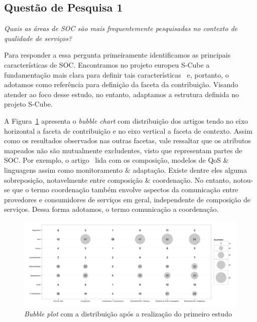 \subsection{Quest\~{a}o de Pesquisa 1}
\emph{Quais as áreas de SOC são mais frequentemente pesquisadas no contexto de qualidade de serviços?}


Para responder a essa pergunta primeiramente identificamos as principais caracter\'{i}sticas de SOC. Encontramos no projeto europeu S-Cube a fundamenta\c{c}\~{a}o mais clara para definir tais caracter\'{i}sticas~\cite{SCube-FINALREPORT} e, portanto, o adotamos como refer\^{e}ncia para definição da faceta da contribui\c{c}\~{a}o. Visando atender ao foco desse estudo, no entanto, adaptamos a estrutura definida no projeto S-Cube. 


A Figura~\ref{fig:bubbleplot-QoSSOC} apresenta o \emph{bubble chart} com distribui\c{c}\~{a}o dos artigos tendo no eixo horizontal a faceta de contribui\c{c}\~{a}o e no eixo vertical a faceta de contexto. Assim como os resultados observados nas outras facetas, vale ressaltar que os atributos mapeados não são mutualmente excludentes, visto que representam partes de SOC. Por exemplo, o artigo~\cite{DBLP:conf/dsn/ZhengL09} lida com os composi\c{c}\~{a}o, modelos de QoS \& linguagens assim como monitoramento \& adapta\c{c}\~{a}o. Existe dentre eles alguma sobreposição, notavelmente entre composição \& coordenação. No entanto, notou-se que o termo coordenação também envolve aspectos da comunicação entre provedores e consumidores de serviços em geral, independente de composição de serviços. Dessa forma adotamos, o termo comunicação a coordena\c{c}\~{a}o.

\begin{figure}[htb]
\centering
\includegraphics[scale=0.4]{imagens/contribuicaoContexto.pdf}
\caption{\emph{Bubble plot} com a distribui\c{c}\~{a}o ap\'{o}s a realiza\c{c}\~{a}o do primeiro  estudo}
\label{fig:bubbleplot-QoSSOC}
\end{figure}

